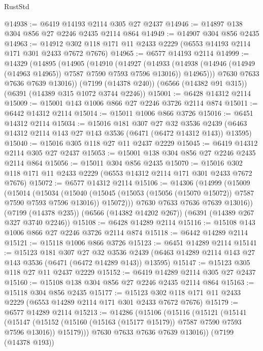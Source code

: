\begin{lexlean}{RustStd}
\begin{coremodule}
{\begin{coremodule}
{{{{{{{{{{{{{{{{{{{{{{{{{{@14938 := @6419 @14193 @2114 @305 @27 @2437
@14946 := @14897 @138 @304 @856 @27 @2246 @2435 @2114 @864
@14949 := @14907 @304 @856 @2435
@14963 := @14912 @302 @118 @171 @11 @2433 @2229 (@6553 @14193 @2114 @171 @301 @2433 @7672 @7676)
@14965 := @6577 @14193 @2114
@14999 := @14329
    (@14895
      (@14905
        (@14910
          (@14927
            (@14933
              (@14938 (@14946 (@14949 (@14963 @14965)) @7587 @7590 @7593 @7596 @13016))
              @14965)))
        @7630
        @7633
        @7636
        @7639
        @13016))
    (@7199 (@14378 @240))
    (@6566 (@14382 @91 @315))
    (@6391 (@14389 @315 @1072 @3744 @2246))
@15001 := @6428 @14312 @2114
@15009 := @15001 @143 @1006 @866 @27 @2246 @3726 @2114 @874
@15011 := @6442 @14312 @2114
@15014 := @15011 @1006 @866 @3726
@15016 := @6451 @14312 @2114
@15034 := @15016
    @181
    @307
    @27
    @32
    @3536
    @2439
    (@6463 @14312 @2114 @143 @27 @143 @3536 (@6471 (@6472 @14312 @143)) @13595)
@15040 := @15016 @305 @118 @27 @11 @2437 @2229
@15045 := @6419 @14312 @2114 @305 @27 @2437
@15053 := @15001 @138 @304 @856 @27 @2246 @2435 @2114 @864
@15056 := @15011 @304 @856 @2435
@15070 := @15016 @302 @118 @171 @11 @2433 @2229 (@6553 @14312 @2114 @171 @301 @2433 @7672 @7676)
@15072 := @6577 @14312 @2114
@15106 := @14306
    (@14999
      (@15009
        (@15014
          (@15034
            (@15040
              (@15045 (@15053 (@15056 (@15070 @15072)) @7587 @7590 @7593 @7596 @13016))
              @15072)))
        @7630
        @7633
        @7636
        @7639
        @13016))
    (@7199 (@14378 @235))
    (@6566 (@14382 @14202 @267))
    (@6391 (@14389 @267 @327 @3740 @2246))
@15108 := @6428 @14289 @2114
@15116 := @15108 @143 @1006 @866 @27 @2246 @3726 @2114 @874
@15118 := @6442 @14289 @2114
@15121 := @15118 @1006 @866 @3726
@15123 := @6451 @14289 @2114
@15141 := @15123
    @181
    @307
    @27
    @32
    @3536
    @2439
    (@6463 @14289 @2114 @143 @27 @143 @3536 (@6471 (@6472 @14289 @143)) @13595)
@15147 := @15123 @305 @118 @27 @11 @2437 @2229
@15152 := @6419 @14289 @2114 @305 @27 @2437
@15160 := @15108 @138 @304 @856 @27 @2246 @2435 @2114 @864
@15163 := @15118 @304 @856 @2435
@15177 := @15123 @302 @118 @171 @11 @2433 @2229 (@6553 @14289 @2114 @171 @301 @2433 @7672 @7676)
@15179 := @6577 @14289 @2114
@15213 := @14286
    (@15106
      (@15116
        (@15121
          (@15141
            (@15147
              (@15152 (@15160 (@15163 (@15177 @15179)) @7587 @7590 @7593 @7596 @13016))
              @15179)))
        @7630
        @7633
        @7636
        @7639
        @13016))
    (@7199 (@14378 @193))
}}}}}}}}}}}}}}}}}}}}}}}}}}
\end{coremodule}}
\end{coremodule}
\end{lexlean}
